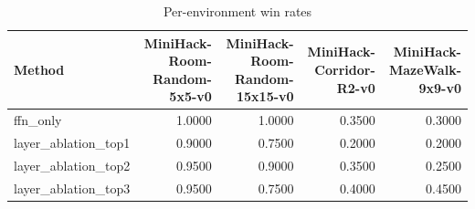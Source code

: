 \begin{table}[htbp]
\centering
\caption{Per-environment win rates}
\label{tab:per-env}
\begin{tabular}{lrrrr}
\toprule
\textbf{Method} & \textbf{MiniHack-Room-Random-5x5-v0} & \textbf{MiniHack-Room-Random-15x15-v0} & \textbf{MiniHack-Corridor-R2-v0} & \textbf{MiniHack-MazeWalk-9x9-v0} \\
\midrule
ffn\_only & 1.0000 & 1.0000 & 0.3500 & 0.3000 \\
layer\_ablation\_top1 & 0.9000 & 0.7500 & 0.2000 & 0.2000 \\
layer\_ablation\_top2 & 0.9500 & 0.9000 & 0.3500 & 0.2500 \\
layer\_ablation\_top3 & 0.9500 & 0.7500 & 0.4000 & 0.4500 \\
\bottomrule
\end{tabular}
\end{table}
